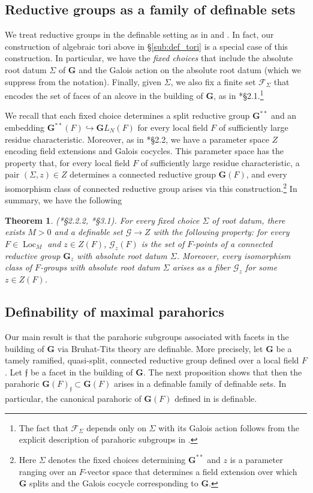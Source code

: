 \documentclass{amsart}
\newcommand{\cF}{\mathcal{F}}
\newcommand{\cG}{\mathcal{G}}
\DeclareMathOperator{\loc}{Loc}
\newcommand{\bG}{\mathbf{G}}
\newcommand{\ff}{{\mathfrak f}}
\theoremstyle{plain}
\newtheorem{theorem}[thm]{Theorem}
\theoremstyle{definition}
\begin{document}
\subsection{Reductive groups as a family of definable sets}
We treat reductive groups in the definable setting as in \cite{hales:transfert} and \cite{CGH-2}.
In fact, our construction of algebraic tori above in \S \ref{sub:def_tori} is a special case of this construction.
In particular, we have the \emph{fixed choices} that include the absolute root datum $\Sigma$ of $\bG$
and the Galois action on the absolute root datum (which we suppress from the notation).
Finally, given $\Sigma$, we also fix a finite set $\cF_\Sigma$ that encodes
the set of faces of an alcove in the building of $\bG$, as in \cite{hales:transfert}*{\S 2.1}.\footnote{The fact that
$\cF_\Sigma$ depends only on $\Sigma$ with its Galois action follows from the explicit description of parahoric subgroups in \cite{gross:parahorics}.}  

We recall that each  fixed choice determines  a split reductive group $\bG^{\ast\ast}$ and an embedding 
$\bG^{\ast\ast}(F)\hookrightarrow {\mathbf GL}_N(F)$ for every local field $F$ of sufficiently large residue characteristic.  
Moreover, as in \cite{hales:transfert}*{\S 2.2}, we have a parameter space $Z$ encoding field extensions and Galois cocycles.
This parameter space has the property that, for every local field $F$ of sufficiently large residue characteristic, a pair 
$(\Sigma, z)\in Z$ determines a connected reductive group $\bG(F)$, and every
isomorphism class of connected reductive group arises via this construction.\footnote{Here
$\Sigma$ denotes the fixed choices determining $\bG^{\ast\ast}$ and $z$ is a parameter ranging over an
$F$-vector space that determines a field extension over which $\bG$ splits and the Galois cocycle corresponding to $\bG$.} 
In summary, we have the following 
\begin{theorem}\label{thm:def_groups}(\cite{hales:transfert}*{\S 2.2.2}, \cite{CGH-2}*{\S 3.1}). 
 For every fixed choice $\Sigma$ of root datum, there exists $M>0$ and a definable set $\cG \to Z$ with the following property:
for every $F\in \loc_M$ and $z \in Z(F)$, ${\cG_z}(F)$ is the set of $F$-points of a connected reductive group
$\bG_z$ with absolute root datum $\Sigma$.  Moreover, every isomorphism class of $F$-groups with absolute root datum 
$\Sigma$ arises as a fiber $\cG_z$ for some $z\in Z(F)$.  
\end{theorem}

\subsection{Definability of maximal parahorics} 
Our main result is that the parahoric subgroups associated with facets in the building of $\bG$ via Bruhat-Tits theory are definable.
More precisely, let $\bG$ be a tamely ramified, quasi-split, connected reductive group defined over a local field $F$.
Let $\ff$ be a facet in the building of $\bG$.  The next proposition shows that
then the parahoric $\bG(F)_\ff\subset \bG(F)$ arises in a definable family of definable sets. 
In particular, the canonical parahoric of $\bG(F)$ defined in \cite{gross:motive} is definable. 
\end{document}
